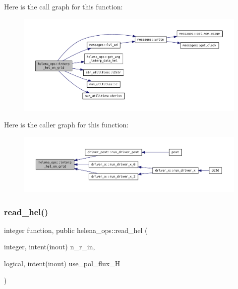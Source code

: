 Here is the call graph for this function\+:\nopagebreak
\begin{figure}[H]
\begin{center}
\leavevmode
\includegraphics[width=350pt]{namespacehelena__ops_a7796861de18ae7ac9c3aa07a8628be38_cgraph}
\end{center}
\end{figure}
Here is the caller graph for this function\+:\nopagebreak
\begin{figure}[H]
\begin{center}
\leavevmode
\includegraphics[width=350pt]{namespacehelena__ops_a7796861de18ae7ac9c3aa07a8628be38_icgraph}
\end{center}
\end{figure}
\mbox{\label{namespacehelena__ops_ae05ba1182eb002d93c27ca4ff7ab8cf2}} 
\subsubsection{\texorpdfstring{read\+\_\+hel()}{read\_hel()}}
{\footnotesize\ttfamily integer function, public helena\+\_\+ops\+::read\+\_\+hel (\begin{DoxyParamCaption}\item[{integer, intent(inout)}]{n\+\_\+r\+\_\+in,  }\item[{logical, intent(inout)}]{use\+\_\+pol\+\_\+flux\+\_\+H }\end{DoxyParamCaption})}



